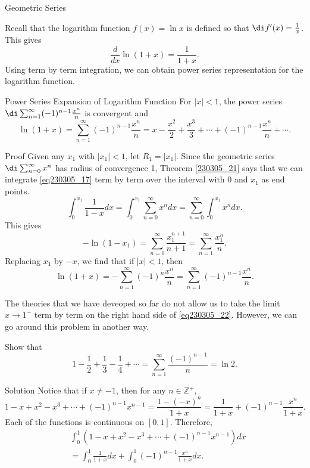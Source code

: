 \begin{example}[label=230305_16]{Geometric Series}
\begin{example}[label=230304_9]{}
\begin{example}{}
Recall that the logarithm function $f(x)=\ln x$ is defined so that
$\di f'(x)=\frac{1}{x}$.
This gives
\[\frac{d}{dx}\ln (1+x)=\frac{1}{1+x}.\]
Using term by term integration, we can obtain power series representation for the logarithm function.
\begin{theorem}{Power Series Expansion of Logarithm Function }
For $|x|<1$, the power series $\di\sum_{n=1}^{\infty}(-1)^{n-1}\frac{x^n}{n}$ is convergent and
\[\ln(1+x)=\sum_{n=1}^{\infty}(-1)^{n-1}\frac{x^n}{n}=x-\frac{x^2}{2}+\frac{x^3}{3}+\cdots+(-1)^{n-1}\frac{x^n}{n}+\cdots.\]
\end{theorem}
\begin{myproof}{Proof}
Given any $x_1$ with $|x_1|<1$, let $R_1=|x_1|$. Since the geometric series $\di \sum_{n=0}^{\infty}x^n$ has radius of convergence 1, Theorem \ref{230305_21} says that we can integrate \eqref{eq230305_17} term by term over the interval with 0 and $x_1$ as end points.
\[\int_0^{x_1}\frac{1}{1-x}dx=\int_0^{x_1}\sum_{n=0}^{\infty}x^ndx=\sum_{n=0}^{\infty}\int_0^{x_1}x^ndx.\]
This gives
\[-\ln(1-x_1)=\sum_{n=0}^{\infty}\frac{x_1^{n+1}}{n+1}=\sum_{n=1}^{\infty}\frac{x_1^n}{n}.\]
Replacing $x_1$ by $-x$, we find that if $|x|<1$, then
\begin{equation}\label{eq230305_22}\ln(1+x)=-\sum_{n=1}^{\infty}(-1)^n\frac{x^n}{n}=\sum_{n=1}^{\infty}(-1)^{n-1}\frac{x^n}{n}.\end{equation}
\end{myproof}
The theories that we have deveoped so far do not allow us to take the limit $x\to 1^-$ term by term on the right hand side of \eqref{eq230305_22}.   However, we can go around this problem in another way.
\begin{example}{}
Show that 
\begin{equation}\label{eq230305_23}1-\frac{1}{2}+\frac{1}{3}-\frac{1}{4}+\cdots=\sum_{n=1}^{\infty}\frac{(-1)^{n-1}}{n}=\ln 2.\end{equation}
\end{example}
\begin{solution}{Solution}
Notice that if $x\neq -1$, then for any $n\in\mathbb{Z}^+$,
\[1-x+x^2-x^3+\cdots+(-1)^{n-1}x^{n-1}=\frac{1-(-x)^{n}}{1+x}=\frac{1}{1+x}+(-1)^{n-1}\frac{x^{n}}{1+x}.\] 
Each of the functions is continuous on $[0,1]$. Therefore, 
\begin{align*}
&\int_0^1\left(1-x+x^2-x^3+\cdots+(-1)^{n-1}x^{n-1}\right)dx\\&=\int_0^1\frac{1}{1+x}dx+\int_0^1(-1)^{n-1}\frac{x^{n}}{1+x}dx.\end{align*}

\end{solution}
\end{example}
\end{example}
\end{example}
